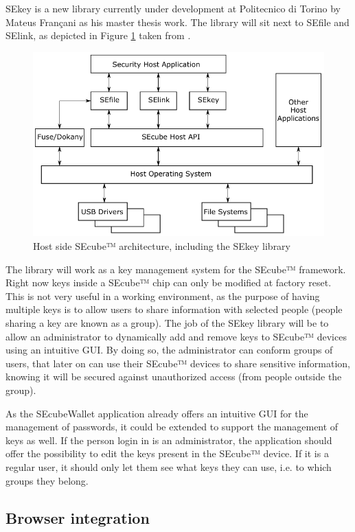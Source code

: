 SEkey is a new library currently under development at Politecnico di Torino by 	Mateus Françani as his master thesis work. The library will sit next to SEfile and SElink, as depicted in Figure \ref{fig:sekey} taken from \cite{sekey}.

\begin{figure}[htb]
  \centering
  \captionsetup{justification=centering}
  \centerline{\includegraphics[width=0.8\columnwidth]{chapters/figures/results/sekey.png}}
  \caption{Host side SEcube™ architecture, including the SEkey library}
  \label{fig:sekey}
\end{figure}

The library will work as a key management system for the SEcube™ framework. Right now keys inside a SEcube™ chip can only be modified at factory reset. This is not very useful in a working environment, as the purpose of having multiple keys is to allow users to share information with selected people (people sharing a key are known as a group). The job of the SEkey library will be to allow an administrator to dynamically add and remove keys to SEcube™ devices using an intuitive GUI. By doing so, the administrator can conform groups of users, that later on can use their SEcube™ devices to share sensitive information, knowing it will be secured against unauthorized access (from people outside the group).

As the SEcubeWallet application already offers an intuitive GUI for the management of passwords, it could be extended to support the management of keys as well. If the person login in is an administrator, the application should offer the possibility to edit the keys present in the SEcube™ device. If it is a regular user, it should only let them see what keys they can use, i.e. to which groups they belong.

\subsection{Browser integration} 

